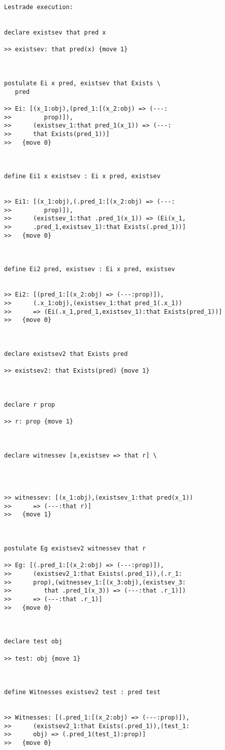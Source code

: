\documentclass[12pt]{article}
\begin{document}
\begin{verbatim}Lestrade execution:


declare existsev that pred x

>> existsev: that pred(x) {move 1}



postulate Ei x pred, existsev that Exists \
   pred

>> Ei: [(x_1:obj),(pred_1:[(x_2:obj) => (---:
>>         prop)]),
>>      (existsev_1:that pred_1(x_1)) => (---:
>>      that Exists(pred_1))]
>>   {move 0}



define Ei1 x existsev : Ei x pred, existsev


>> Ei1: [(x_1:obj),(.pred_1:[(x_2:obj) => (---:
>>         prop)]),
>>      (existsev_1:that .pred_1(x_1)) => (Ei(x_1,
>>      .pred_1,existsev_1):that Exists(.pred_1))]
>>   {move 0}



define Ei2 pred, existsev : Ei x pred, existsev


>> Ei2: [(pred_1:[(x_2:obj) => (---:prop)]),
>>      (.x_1:obj),(existsev_1:that pred_1(.x_1))
>>      => (Ei(.x_1,pred_1,existsev_1):that Exists(pred_1))]
>>   {move 0}



declare existsev2 that Exists pred

>> existsev2: that Exists(pred) {move 1}



declare r prop

>> r: prop {move 1}



declare witnessev [x,existsev => that r] \
   



>> witnessev: [(x_1:obj),(existsev_1:that pred(x_1))
>>      => (---:that r)]
>>   {move 1}



postulate Eg existsev2 witnessev that r

>> Eg: [(.pred_1:[(x_2:obj) => (---:prop)]),
>>      (existsev2_1:that Exists(.pred_1)),(.r_1:
>>      prop),(witnessev_1:[(x_3:obj),(existsev_3:
>>         that .pred_1(x_3)) => (---:that .r_1)])
>>      => (---:that .r_1)]
>>   {move 0}



declare test obj

>> test: obj {move 1}



define Witnesses existsev2 test : pred test


>> Witnesses: [(.pred_1:[(x_2:obj) => (---:prop)]),
>>      (existsev2_1:that Exists(.pred_1)),(test_1:
>>      obj) => (.pred_1(test_1):prop)]
>>   {move 0}


\end{verbatim}
\end{document}
